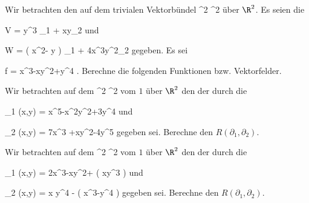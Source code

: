 \setcounter{section}{28}


{}
{

Wir betrachten den
auf dem trivialen Vektorbündel
\maabbdisp {} {\R^2 \times \R } { \R^2
} {}
über $\R^2$. Es seien die

\mavergleichskettedisp
{\vergleichskette
{ V
}
{ =} { y^3 \partial_1 + xy\partial_2
}
{ } {
}
{ } {
}
{ } {
}
}
{}{}{}
und

\mavergleichskettedisp
{\vergleichskette
{ W
}
{ =} { \left(  x^2- y  \right)  \partial_1 + 4x^3y^2\partial_2
}
{ } {
}
{ } {
}
{ } {
}
}
{}{}{}
gegeben. Es sei

\mavergleichskettedisp
{\vergleichskette
{ f
}
{ =} { x^3-xy^2+y^4
}
{ } {
}
{ } {
}
{ } {
}
}
{}{}{.}
Berechne die folgenden Funktionen bzw. Vektorfelder.

}
{} {}

{}
{

Wir betrachten auf dem
 {\R^2 \times \R} { \R^2
} {}
vom
$1$ über $\R^2$ den
der durch die

\mavergleichskette
{\vergleichskette
{ \Gamma_1 (x,y)
}
{ = }{ x^5-x^2y^2+3y^4
}
{  }{
}
{    }{
}
{   }{
}
}
{}{}{}
und

\mavergleichskette
{\vergleichskette
{ \Gamma_2 (x,y)
}
{ = }{ 7x^3 +xy^2-4y^5
}
{  }{
}
{    }{
}
{   }{
}
}
{}{}{}
gegeben sei. Berechne den
$R \left(  \partial_1, \partial_2  \right)$.

}
{} {}

{}
{

Wir betrachten auf dem
 {\R^2 \times \R} { \R^2
} {}
vom
$1$ über $\R^2$ den
der durch die

\mavergleichskette
{\vergleichskette
{ \Gamma_1 (x,y)
}
{ = }{ 2x^3-xy^2+  \sinh  \left(  xy^3  \right)
}
{  }{
}
{    }{
}
{   }{
}
}
{}{}{}
und

\mavergleichskette
{\vergleichskette
{ \Gamma_2 (x,y)
}
{ = }{ x y^4 -   \exp  \left(  x^3-y^4 \right)
}
{  }{
}
{    }{
}
{   }{
}
}
{}{}{}
gegeben sei. Berechne den
$R \left(  \partial_1, \partial_2  \right)$.

}
{} {}

